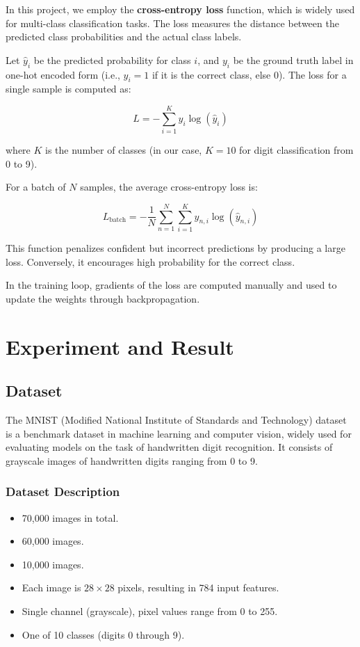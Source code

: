 \documentclass[conference]{IEEEtran}
\begin{document}
In this project, we employ the \textbf{cross-entropy loss} function, which is widely used for multi-class classification tasks. The loss measures the distance between the predicted class probabilities and the actual class labels.

Let $\hat{y}_i$ be the predicted probability for class $i$, and $y_i$ be the ground truth label in one-hot encoded form (i.e., $y_i = 1$ if it is the correct class, else $0$). The loss for a single sample is computed as:

\[
L = -\sum_{i=1}^{K} y_i \log(\hat{y}_i)
\]

where $K$ is the number of classes (in our case, $K = 10$ for digit classification from 0 to 9).

For a batch of $N$ samples, the average cross-entropy loss is:

\[
L_{\text{batch}} = -\frac{1}{N} \sum_{n=1}^{N} \sum_{i=1}^{K} y_{n,i} \log(\hat{y}_{n,i})
\]

This function penalizes confident but incorrect predictions by producing a large loss. Conversely, it encourages high probability for the correct class.

In the training loop, gradients of the loss are computed manually and used to update the weights through backpropagation.

\section{Experiment and Result}
\subsection{Dataset}

The MNIST (Modified National Institute of Standards and Technology) dataset is a benchmark dataset in machine learning and computer vision, widely used for evaluating models on the task of handwritten digit recognition. It consists of grayscale images of handwritten digits ranging from 0 to 9.

\subsubsection{Dataset Description}

\begin{itemize}
    \item {} 70,000 images in total.
    \item {} 60,000 images.
    \item {} 10,000 images.
    \item {} Each image is $28 \times 28$ pixels, resulting in 784 input features.
    \item {} Single channel (grayscale), pixel values range from 0 to 255.
    \item {} One of 10 classes (digits 0 through 9).
\end{itemize}
\end{document}

